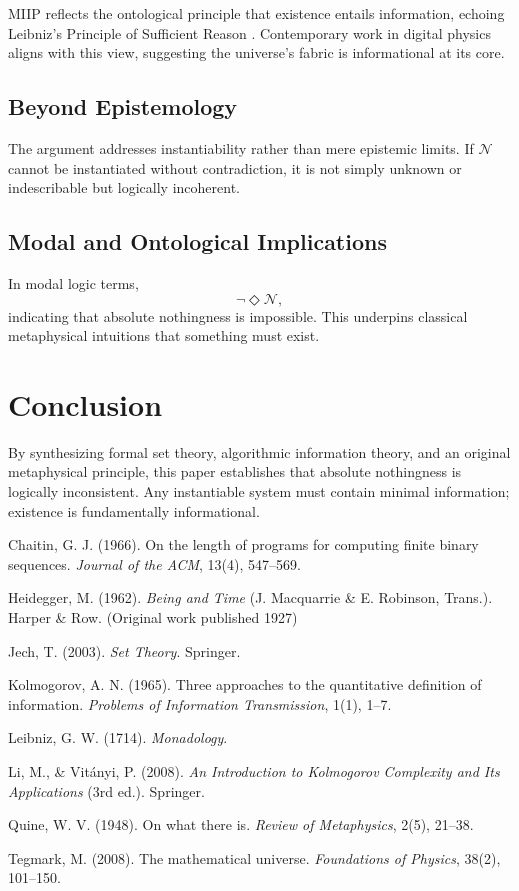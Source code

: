 \documentclass[12pt,a4paper]{article}
\begin{document}
MIIP reflects the ontological principle that existence entails information, echoing Leibniz’s Principle of Sufficient Reason \cite{Leibniz1714}. Contemporary work in digital physics \cite{Tegmark2008} aligns with this view, suggesting the universe’s fabric is informational at its core.

\subsection{Beyond Epistemology}

The argument addresses instantiability rather than mere epistemic limits. If $\mathcal{N}$ cannot be instantiated without contradiction, it is not simply unknown or indescribable but logically incoherent.

\subsection{Modal and Ontological Implications}

In modal logic terms,
\[
\neg \Diamond \mathcal{N},
\]
indicating that absolute nothingness is impossible. This underpins classical metaphysical intuitions that something must exist.

\section{Conclusion}

By synthesizing formal set theory, algorithmic information theory, and an original metaphysical principle, this paper establishes that absolute nothingness is logically inconsistent. Any instantiable system must contain minimal information; existence is fundamentally informational.

\begin{thebibliography}{99}

Chaitin, G. J. (1966). On the length of programs for computing finite binary sequences. \textit{Journal of the ACM}, 13(4), 547--569.

Heidegger, M. (1962). \textit{Being and Time} (J. Macquarrie \& E. Robinson, Trans.). Harper \& Row. (Original work published 1927)

Jech, T. (2003). \textit{Set Theory}. Springer.

Kolmogorov, A. N. (1965). Three approaches to the quantitative definition of information. \textit{Problems of Information Transmission}, 1(1), 1--7.

Leibniz, G. W. (1714). \textit{Monadology}.

Li, M., \& Vitányi, P. (2008). \textit{An Introduction to Kolmogorov Complexity and Its Applications} (3rd ed.). Springer.

Quine, W. V. (1948). On what there is. \textit{Review of Metaphysics}, 2(5), 21--38.

Tegmark, M. (2008). The mathematical universe. \textit{Foundations of Physics}, 38(2), 101--150.

\end{thebibliography}
\end{document}
